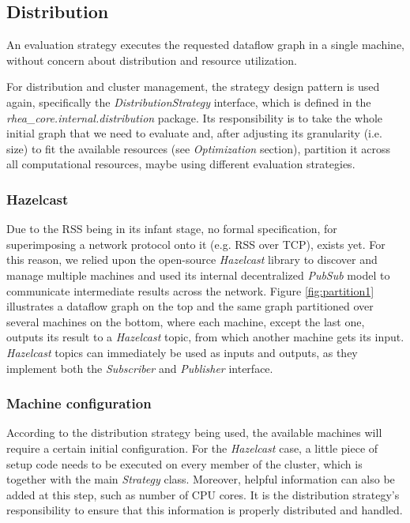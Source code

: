 \documentclass[sigplan,review,anonymous]{acmart}
\begin{document}
\subsection{Distribution}

An evaluation strategy executes the requested dataflow graph in a single
machine, without concern about distribution and resource utilization.

For distribution and cluster management, the strategy design pattern is used
again, specifically the \textit{DistributionStrategy} interface, which is
defined in the \textit{rhea\_core.internal.distribution} package. Its
responsibility is to take the whole initial graph that we need to evaluate and,
after adjusting its granularity (i.e. size) to fit the available resources (see
\textit{Optimization} section), partition it across all computational resources,
maybe using different evaluation strategies.

\subsubsection{Hazelcast}

Due to the RSS being in its infant stage, no formal specification, for
superimposing a network protocol onto it (e.g. RSS over TCP), exists yet. For
this reason, we relied upon the open-source \textit{Hazelcast}
library to discover and manage multiple machines and
used its internal decentralized \textit{PubSub} model to communicate
intermediate results across the network. Figure \ref{fig:partition1} illustrates
a dataflow graph on the top and the same graph partitioned over several machines
on the bottom, where each machine, except the last one, outputs its result to a
\textit{Hazelcast} topic, from which another machine gets its input.
\textit{Hazelcast} topics can immediately be used as inputs and outputs, as they
implement both the \textit{Subscriber} and \textit{Publisher} interface.


\subsubsection{Machine configuration}

According to the distribution strategy being used, the available machines will
require a certain initial configuration. For the \textit{Hazelcast} case, a
little piece of setup code needs to be executed on every member of the cluster,
which is together with the main \textit{Strategy} class. Moreover, helpful
information can also be added at this step, such as number of CPU cores. It is
the distribution strategy's responsibility to ensure that this information is
properly distributed and handled.
\end{document}
